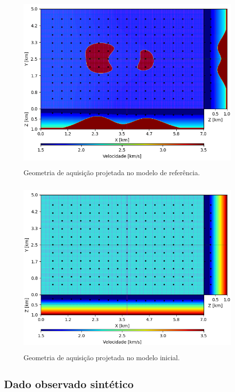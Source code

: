 \begin{figure}[H]
	\centering
	\includegraphics[width=12cm,height=9cm]{Imgs/Metodologia/true_model_geometry.png}
	\caption{Geometria de aquisição projetada no modelo de referência.}
	\label{fig:true_model_geometry}	
\end{figure}
\begin{figure}[H]
	\centering
	\includegraphics[width=12cm,height=9cm]{Imgs/Metodologia/init_model_geometry.png}
	\caption{Geometria de aquisição projetada no modelo inicial.}
	\label{fig:init_model_geometry}	
\end{figure}

\subsection*{Dado observado sintético}

